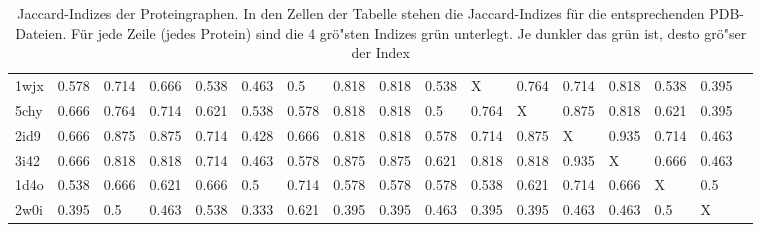 \documentclass{report}
\begin{document}
\begin{table}
{\begin{tabular}{l l l l l l l l l l l l l l l l l}
1wjx & 0.578 & 0.714 & 0.666 & 0.538 & 0.463 & 0.5 & \cellcolor{fGreen!50}0.818 & \cellcolor{fGreen!100}0.818 & 0.538 &   X   & \cellcolor{fGreen!25}0.764 & 0.714 & \cellcolor{fGreen!75}0.818 & 0.538 & 0.395 &  \\
5chy & 0.666 & 0.764 & 0.714 & 0.621 & 0.538 & 0.578 & \cellcolor{fGreen!75}0.818 & \cellcolor{fGreen!25}0.818 & 0.5 & 0.764 &   X   & \cellcolor{fGreen!100}0.875 & \cellcolor{fGreen!50}0.818 & 0.621 & 0.395 &  \\
2id9 & 0.666 & \cellcolor{fGreen!50}0.875 & \cellcolor{fGreen!25}0.875 & 0.714 & 0.428 & 0.666 & 0.818 & 0.818 & 0.578 & 0.714 & \cellcolor{fGreen!75}0.875 &   X   & \cellcolor{fGreen!100}0.935 & 0.714 & 0.463 &  \\
3i42 & 0.666 & 0.818 & 0.818 & 0.714 & 0.463 & 0.578 & \cellcolor{fGreen!50}0.875 & \cellcolor{fGreen!75}0.875 & 0.621 & \cellcolor{fGreen!25}0.818 & 0.818 & \cellcolor{fGreen!100}0.935 &   X   & 0.666 & 0.463 &  \\
1d4o & 0.538 & \cellcolor{fGreen!50}0.666 & 0.621 & 0.666 & 0.5 & \cellcolor{fGreen!100}0.714 & 0.578 & 0.578 & 0.578 & 0.538 & 0.621 & \cellcolor{fGreen!75}0.714 & \cellcolor{fGreen!25}0.666 &   X   & 0.5 &  \\
2w0i & 0.395 & \cellcolor{fGreen!50}0.5 & 0.463 & \cellcolor{fGreen!75}0.538 & 0.333 & \cellcolor{fGreen!100}0.621 & 0.395 & 0.395 & 0.463 & 0.395 & 0.395 & 0.463 & 0.463 & \cellcolor{fGreen!25}0.5 &   X   &  \\

\end{tabular}}
\caption{Jaccard-Indizes der Proteingraphen. In den Zellen der Tabelle stehen die Jaccard-Indizes f\"ur die entsprechenden PDB-Dateien. F\"ur jede Zeile (jedes Protein) sind die 4 gr\"o"sten Indizes gr\"un unterlegt. Je dunkler das gr\"un ist, desto gr\"o"ser der Index}
\end{table}
\end{document}
